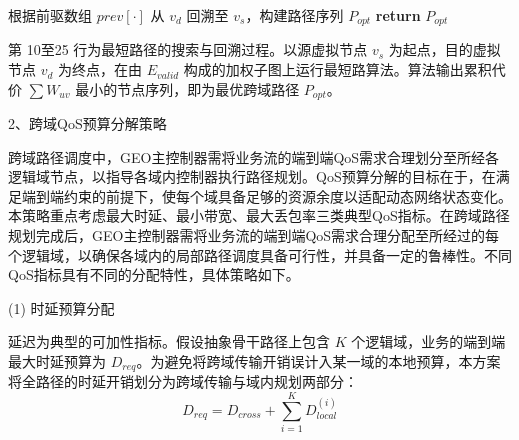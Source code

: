 \documentclass[print, master, vlined]{DissertUESTC}
\begin{document}
\begin{algorithm}[!htbp]
    
      根据前驱数组 $prev[\cdot]$ 从 $v_d$ 回溯至 $v_s$，构建路径序列 $P_{opt}$\;
      \textbf{return} $P_{opt}$\;
    
    \end{algorithm}
    
    第 10至25 行为最短路径的搜索与回溯过程。以源虚拟节点 \( v_s \) 为起点，目的虚拟节点 \( v_d \) 为终点，在由 \( E_{valid} \) 构成的加权子图上运行最短路算法。算法输出累积代价 \( \sum W_{uv} \) 最小的节点序列，即为最优跨域路径 \( P_{opt} \)。
    
    

    2、跨域QoS预算分解策略
    \label{sec: 跨域QoS预算分解策略}
    
    跨域路径调度中，GEO主控制器需将业务流的端到端QoS需求合理划分至所经各逻辑域节点，以指导各域内控制器执行路径规划。QoS预算分解的目标在于，在满足端到端约束的前提下，使每个域具备足够的资源余度以适配动态网络状态变化。本策略重点考虑最大时延、最小带宽、最大丢包率三类典型QoS指标。在跨域路径规划完成后，GEO主控制器需将业务流的端到端QoS需求合理分配至所经过的每个逻辑域，以确保各域内的局部路径调度具备可行性，并具备一定的鲁棒性。不同QoS指标具有不同的分配特性，具体策略如下。
    
    (1) 时延预算分配
    
    延迟为典型的可加性指标。假设抽象骨干路径上包含 $K$ 个逻辑域，业务的端到端最大时延预算为 $D_{req}$。为避免将跨域传输开销误计入某一域的本地预算，本方案将全路径的时延开销划分为跨域传输与域内规划两部分：
    \begin{equation}
        D_{req} = D_{cross} + \sum_{i=1}^{K} D_{local}^{(i)}
    \end{equation}
    
\end{document}
